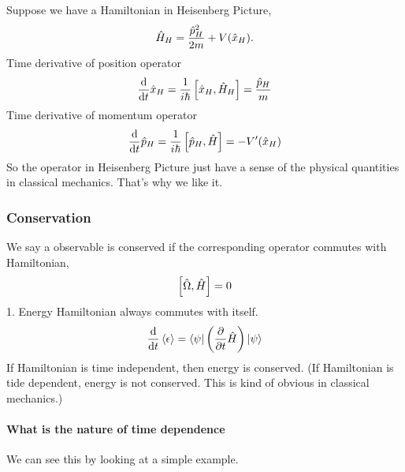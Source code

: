 \documentclass[letterpaper,10pt,english]{sphinxmanual}
\def\d{{\rm d}}
\newcommand{\bra}[1]{\left\langle #1\right|}
\newcommand{\ket}[1]{\left| #1\right\rangle}
\begin{document}
Suppose we have a Hamiltonian in Heisenberg Picture,
\begin{gather}
\begin{split}\hat H_H = \frac{\hat p _ H^2 }{2m} + V(\hat x _ H) .\end{split}\notag
\end{gather}
Time derivative of position operator
\begin{gather}
\begin{split}\frac{\d}{\d t} \hat x _ H = \frac{1}{i\hbar} \left[\hat x _ H, \hat H _ H \right ] = \frac{\hat p _ H}{m}\end{split}\notag
\end{gather}
Time derivative of momentum operator
\begin{gather}
\begin{split}\frac{\d}{\d t} \hat p_H = \frac{1}{i\hbar } \left[ \hat p _ H, \hat H \right] = - V'(\hat x_H)\end{split}\notag
\end{gather}
So the operator in Heisenberg Picture just have a sense of the physical quantities in classical mechanics. That's why we like it.


\subsubsection{Conservation}
\label{Quantum/QuantumMechanics:conservation}
We say a observable is conserved if the corresponding operator commutes with Hamiltonian,
\begin{gather}
\begin{split}\left[ \hat \Omega, \hat H \right]=0\end{split}\notag
\end{gather}
1. Energy
Hamiltonian always commutes with itself.
\begin{gather}
\begin{split}\frac{\d}{\d t} \left<\epsilon \right> = \bra{\psi} \left( \frac{\partial }{\partial t} \hat H \right) \ket{\psi}\end{split}\notag
\end{gather}
If Hamiltonian is time independent, then energy is conserved. (If Hamiltonian is tide dependent, energy is not conserved. This is kind of obvious in classical mechanics.)


\paragraph{What is the nature of time dependence}
\label{Quantum/QuantumMechanics:what-is-the-nature-of-time-dependence}
We can see this by looking at a simple example.
\end{document}
